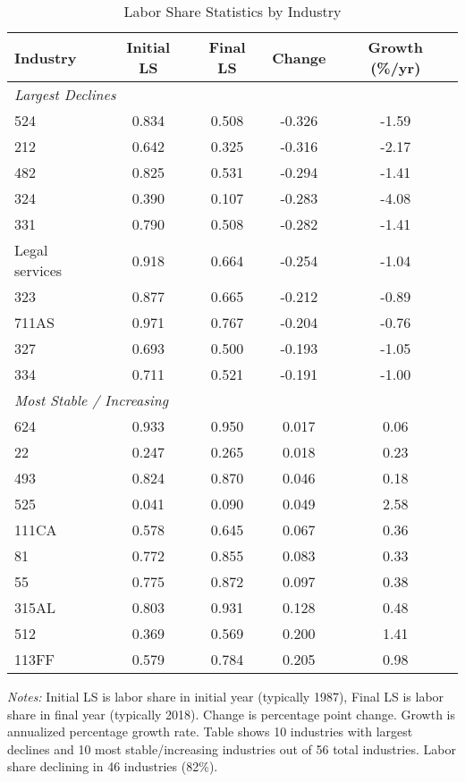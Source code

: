 \begin{table}[H]
\centering
\caption{Labor Share Statistics by Industry}
\label{tab:labor_share_by_industry}
\scriptsize
\begin{tabularx}{\textwidth}{Xcccc}
\toprule
Industry & Initial LS & Final LS & Change & Growth (\%/yr) \\
\midrule
\multicolumn{5}{l}{\textit{Largest Declines}} \\
524 & 0.834 & 0.508 & -0.326 & -1.59 \\
212 & 0.642 & 0.325 & -0.316 & -2.17 \\
482 & 0.825 & 0.531 & -0.294 & -1.41 \\
324 & 0.390 & 0.107 & -0.283 & -4.08 \\
331 & 0.790 & 0.508 & -0.282 & -1.41 \\
Legal services & 0.918 & 0.664 & -0.254 & -1.04 \\
323 & 0.877 & 0.665 & -0.212 & -0.89 \\
711AS & 0.971 & 0.767 & -0.204 & -0.76 \\
327 & 0.693 & 0.500 & -0.193 & -1.05 \\
334 & 0.711 & 0.521 & -0.191 & -1.00 \\
\midrule
\multicolumn{5}{l}{\textit{Most Stable / Increasing}} \\
624 & 0.933 & 0.950 & 0.017 & 0.06 \\
22 & 0.247 & 0.265 & 0.018 & 0.23 \\
493 & 0.824 & 0.870 & 0.046 & 0.18 \\
525 & 0.041 & 0.090 & 0.049 & 2.58 \\
111CA & 0.578 & 0.645 & 0.067 & 0.36 \\
81 & 0.772 & 0.855 & 0.083 & 0.33 \\
55 & 0.775 & 0.872 & 0.097 & 0.38 \\
315AL & 0.803 & 0.931 & 0.128 & 0.48 \\
512 & 0.369 & 0.569 & 0.200 & 1.41 \\
113FF & 0.579 & 0.784 & 0.205 & 0.98 \\
\bottomrule
\end{tabularx}
\begin{minipage}{\textwidth}
\vspace{0.2cm}
\footnotesize
\textit{Notes:} Initial LS is labor share in initial year (typically 1987), Final LS is labor share in final year (typically 2018). 
Change is percentage point change. Growth is annualized percentage growth rate. 
Table shows 10 industries with largest declines and 10 most stable/increasing industries out of 56 total industries.
Labor share declining in 46 industries (82\%).
\end{minipage}
\end{table}